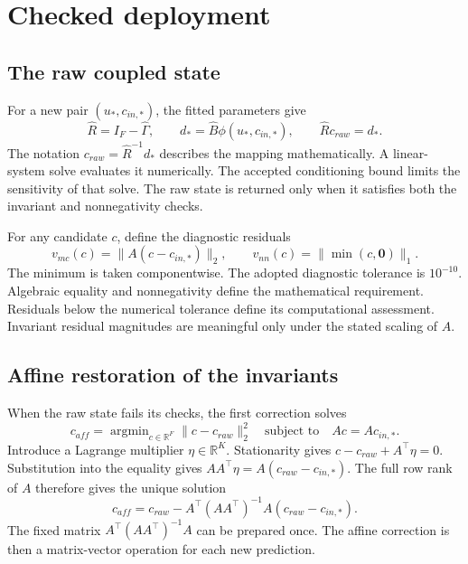 \section{Checked deployment}

\subsection{The raw coupled state}

For a new pair \((u_*,c_{in,*})\), the fitted parameters give
\begin{equation}
\label{eq:icsor_raw_state}
\widehat R=I_F-\widehat\Gamma,
\qquad d_* =\widehat B\phi(u_*,c_{in,*}),
\qquad \widehat R c_{raw}=d_*.
\end{equation}
The notation \(c_{raw}=\widehat R^{-1}d_*\) describes the mapping mathematically. A linear-system solve evaluates it numerically. The accepted conditioning bound limits the sensitivity of that solve. The raw state is returned only when it satisfies both the invariant and nonnegativity checks.

For any candidate \(c\), define the diagnostic residuals
\begin{equation}
\label{eq:icsor_deployment_diagnostics}
v_{mc}(c)=\|A(c-c_{in,*})\|_2,
\qquad
v_{nn}(c)=\|\min(c,\mathbf{0})\|_1.
\end{equation}
The minimum is taken componentwise. The adopted diagnostic tolerance is \(10^{-10}\). Algebraic equality and nonnegativity define the mathematical requirement. Residuals below the numerical tolerance define its computational assessment. Invariant residual magnitudes are meaningful only under the stated scaling of \(A\).

\subsection{Affine restoration of the invariants}

When the raw state fails its checks, the first correction solves
\begin{equation}
\label{eq:icsor_affine_problem}
c_{aff}=\mathop{\arg\min}_{c\in\mathbb{R}^{F}}\|c-c_{raw}\|_2^2
\quad\text{subject to}\quad Ac=Ac_{in,*}.
\end{equation}
Introduce a Lagrange multiplier \(\eta\in\mathbb{R}^{K}\). Stationarity gives \(c-c_{raw}+A^\top\eta=0\). Substitution into the equality gives \(AA^\top\eta=A(c_{raw}-c_{in,*})\). The full row rank of \(A\) therefore gives the unique solution
\begin{equation}
\label{eq:icsor_affine_solution}
c_{aff}=c_{raw}-A^\top(AA^\top)^{-1}A(c_{raw}-c_{in,*}).
\end{equation}
The fixed matrix \(A^\top(AA^\top)^{-1}A\) can be prepared once. The affine correction is then a matrix-vector operation for each new prediction.

